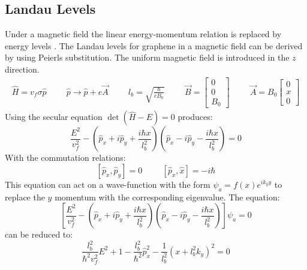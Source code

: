 		\subsection{Landau Levels}
			Under a magnetic field the linear energy-momentum relation is replaced by energy levels \cite{b33}. The Landau levels for graphene in a magnetic field can be derived by using Peierls substitution. The uniform magnetic field is introduced in the $z$ direction.
			\begin{align}
				\hat{H}=v_{f}\sigma \hat{p}
				\hspace{1cm}
				\hat{p}\rightarrow \hat{p}+e\vec{A}
				\hspace{1cm}
				l_{b}=\sqrt{\frac{\hbar}{eB_{0}}}
				\hspace{1cm}
				\vec{B}=
				\left[\begin{array}{ccc}
					0\\
					0\\
					B_{0}
				\end{array}\right]
				\hspace{1cm}
				\vec{A}=B_{0}
				\left[\begin{array}{ccc}
					0\\
					x\\
					0
				\end{array}\right]
			\end{align}
			Using the secular equation $\det\left(\hat{H}-E\right)=0$ produces:
			\begin{equation}
				\frac{E^{2}}{v_{f}^{2}}-\left(\hat{p}_{x}+i\hat{p}_{y}+\frac{i\hbar x}{ l_{b}^{2}}\right)\left(\hat{p}_{x}-i\hat{p}_{y}-\frac{i\hbar x}{ l_{b}^{2}}\right)=0
			\end{equation}
			With the commutation relations:
			\begin{equation}
				\left[\hat{p}_{x},\hat{p}_{y}\right]=0\hspace{1cm}\left[\hat{p}_{x},\hat{x}\right]=-i\hbar
			\end{equation}
			This equation can act on a wave-function with the form $\psi_{a}=f(x)e^{ik_{y}y}$ to replace the $y$ momentum with the corresponding eigenvalue. The equation:
			\begin{equation}
				\left[\frac{E^{2}}{v_{f}^{2}}-\left(\hat{p}_{x}+i\hat{p}_{y}+\frac{i\hbar x}{ l_{b}^{2}}\right)\left(\hat{p}_{x}-i\hat{p}_{y}-\frac{i\hbar x}{ l_{b}^{2}}\right)\right]\psi_{a}=0
			\end{equation}
			can be reduced to:
			\begin{equation}
				\frac{l_{b}^{2}}{\hbar^{2}v_{f}^{2}}E^{2}+1-\frac{l_{b}^{2}}{\hbar^{2}}\hat{p}_{x}^{2}-\frac{1}{l_{b}^{2}}\left(x+l_{b}^{2}k_{y}\right)^{2}=0
				\label{introduction-mag-int}
			\end{equation}
